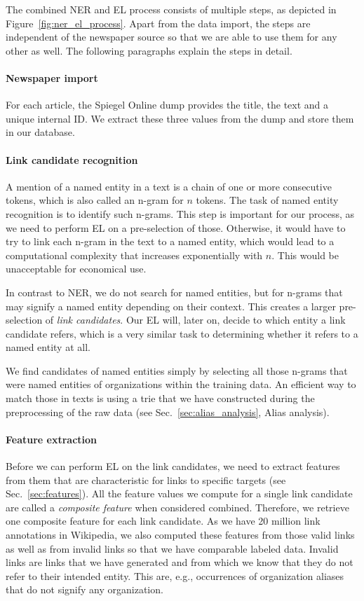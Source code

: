 The combined NER and EL process consists of multiple steps, as depicted in Figure~\ref{fig:ner_el_process}. Apart from the data import, the steps are independent of the newspaper source so that we are able to use them for any other as well. The following paragraphs explain the steps in detail.


\paragraph{Newspaper import}
For each article, the Spiegel Online dump provides the title, the text and a unique internal ID. We extract these three values from the dump and store them in our database.


\paragraph{Link candidate recognition}
A mention of a named entity in a text is a chain of one or more consecutive tokens, which is also called an n-gram for $n$ tokens. The task of named entity recognition is to identify such n-grams. This step is important for our process, as we need to perform EL on a pre-selection of those. Otherwise, it would have to try to link each n-gram in the text to a named entity, which would lead to a computational complexity that increases exponentially with $n$. This would be unacceptable for economical use.

In contrast to NER, we do not search for named entities, but for n-grams that may signify a named entity depending on their context. This creates a larger pre-selection of \textit{link candidates}. Our EL will, later on, decide to which entity a link candidate refers, which is a very similar task to determining whether it refers to a named entity at all.

We find candidates of named entities simply by selecting all those n-grams that were named entities of organizations within the training data. An efficient way to match those in texts is using a trie that we have constructed during the preprocessing of the raw data (see Sec.~\ref{sec:alias_analysis}, Alias analysis).


\paragraph{Feature extraction}
Before we can perform EL on the link candidates, we need to extract features from them that are characteristic for links to specific targets (see Sec.~\ref{sec:features}). All the feature values we compute for a single link candidate are called a \textit{composite feature} when considered combined. Therefore, we retrieve one composite feature for each link candidate. As we have 20 million link annotations in Wikipedia, we also computed these features from those valid links as well as from invalid links so that we have comparable labeled data. Invalid links are links that we have generated and from which we know that they do not refer to their intended entity. This are, e.g., occurrences of organization aliases that do not signify any organization.


